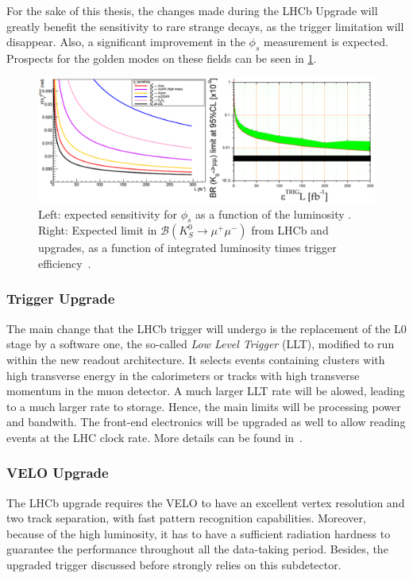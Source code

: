 For the sake of this thesis, the changes made during the LHCb Upgrade will greatly benefit the sensitivity to rare strange decays, as the trigger limitation will disappear. Also, a significant improvement in the $\phi_s$ measurement is expected. Prospects for the golden modes on these fields can be seen in \ref{fig:prospects}.

\begin{figure} [htb!]
\begin{center}
\includegraphics[scale=0.55]{figs/prospects.png}
\caption{Left: expected sensitivity for $\phi_s$ as a function of the luminosity . Right: Expected limit in $\mathcal{B}(K_S^0 \rightarrow \mu^+ \mu^-)$ from LHCb and upgrades, as a function of integrated luminosity times trigger efficiency~\cite{Santos:2018zbz}.\label{fig:prospects}}
\end{center}
\end{figure}

\subsubsection{Trigger Upgrade} 
The main change that the LHCb trigger will undergo is the replacement of the L0 stage by a software one, the so-called \textit{Low Level Trigger} (LLT), modified to run within the new readout architecture. It selects events containing clusters with high transverse energy in the calorimeters or tracks with high transverse momentum in the muon detector. A much larger LLT rate will be alowed, leading to a much larger rate to storage. Hence, the main limits will be processing power and bandwith. The front-end electronics will be upgraded as well to allow reading events at the LHC clock rate. More details can be found in~\cite{LHCbCollaboration:2014vzo}. 

\subsubsection{VELO Upgrade} %
The LHCb upgrade requires the VELO to have an excellent vertex resolution and two track separation, with fast pattern recognition capabilities. Moreover, because of the high luminosity, it has to have a sufficient radiation hardness to guarantee the performance throughout all the data-taking period. Besides, the upgraded trigger discussed before strongly relies on this subdetector. 

